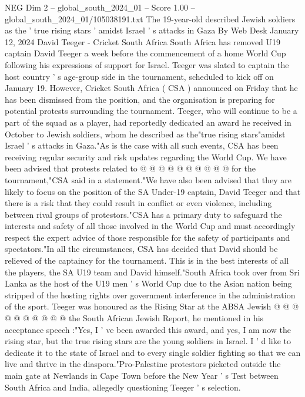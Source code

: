 \begin{textsample}{NEG Dim 2 – global\_south\_2024\_01 – Score 1.00 – global\_south\_2024\_01/105038191.txt}  \label{ex:f2_neg_325}
The 19-year-old described Jewish soldiers as the ' true rising stars ' amidst Israel ' s attacks in Gaza By Web Desk January 12, 2024 David Teeger - Cricket South Africa South Africa has removed U19 captain David Teeger a week before the commencement of a home World Cup following his expressions of support for Israel.
Teeger was slated to captain the host country ' s age-group side in the tournament, scheduled to kick off on January 19.
However, Cricket South Africa ( CSA ) announced on Friday that he has been dismissed from the position, and the organisation is preparing for potential protests surrounding the tournament.
Teeger, who will continue to be a part of the squad as a player, had reportedly dedicated an award he received in October to Jewish soldiers, whom he described as the"true rising stars"amidst Israel ' s attacks in Gaza."As is the case with all such events, CSA has been receiving regular security and risk updates regarding the World Cup.
We have been advised that protests related to @ @ @ @ @ @ @ @ @ @ for the tournament,"CSA said in a statement."We have also been advised that they are likely to focus on the position of the SA Under-19 captain, David Teeger and that there is a risk that they could result in conflict or even violence, including between rival groups of protestors."CSA has a primary duty to safeguard the interests and safety of all those involved in the World Cup and must accordingly respect the expert advice of those responsible for the safety of participants and spectators."In all the circumstances, CSA has decided that David should be relieved of the captaincy for the tournament.
This is in the best interests of all the players, the SA U19 team and David himself."South Africa took over from Sri Lanka as the host of the U19 men ' s World Cup due to the Asian nation being stripped of the hosting rights over government interference in the administration of the sport.
Teeger was honoured as the Rising Star at the ABSA Jewish @ @ @ @ @ @ @ @ @ @ the South African Jewish Report, he mentioned in his acceptance speech :"Yes, I ' ve been awarded this award, and yes, I am now the rising star, but the true rising stars are the young soldiers in Israel.
I ' d like to dedicate it to the state of Israel and to every single soldier fighting so that we can live and thrive in the diaspora."Pro-Palestine protestors picketed outside the main gate at Newlands in Cape Town before the New Year ' s Test between South Africa and India, allegedly questioning Teeger ' s selection.

\end{textsample}
